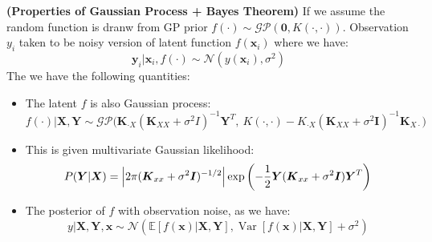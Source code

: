 \begin{remark}{\textbf{(Properties of Gaussian Process + Bayes Theorem)}}
    If we assume the random function is dranw from GP prior $f(\cdot) \sim \mathcal{GP}(\boldsymbol 0, K(\cdot, \cdot))$. Observation $y_i$ taken to be noisy version of latent function $f(\boldsymbol x_i)$ where we have:
    \begin{equation*}
        \boldsymbol y_i | \boldsymbol x_i, f(\cdot) \sim \mathcal{N}(y(\boldsymbol x_i), \sigma^2)
    \end{equation*}
    The we have the following quantities:
    \begin{itemize}
        \item The latent $f$ is also Gaussian process:
        \begin{equation*}
            f(\cdot) | \boldsymbol X, \boldsymbol Y \sim \mathcal{GP}\Big( \boldsymbol K_{\cdot X}(\boldsymbol K_{XX} + \sigma^2I)^{-1}\boldsymbol Y^T, \ K(\cdot,\cdot) - K_{\cdot X}(\boldsymbol K_{XX} + \sigma^2\boldsymbol I)^{-1}\boldsymbol K_{X\cdot} \Big)
        \end{equation*}
        \item This is given multivariate Gaussian likelihood:
        \begin{equation*}
            P(\boldsymbol Y | \boldsymbol X) = \left| 2\pi(\boldsymbol K_{xx} + \sigma^2\boldsymbol I)^{-1/2} \right|\exp\left( -\frac{1}{2}\boldsymbol Y(\boldsymbol K_{xx} + \sigma^2\boldsymbol I)\boldsymbol Y^T \right)
        \end{equation*}
        \item The posterior of $f$ with observation noise, as we have:
        \begin{equation*}
            y | \boldsymbol X, \boldsymbol Y, \boldsymbol x \sim \mathcal{N}(\mathbb{E}[f(\boldsymbol x) | \boldsymbol X, \boldsymbol Y], \operatorname{Var}[f(\boldsymbol x) | \boldsymbol X, \boldsymbol Y] + \sigma^2)
        \end{equation*}
    \end{itemize}
\end{remark}



